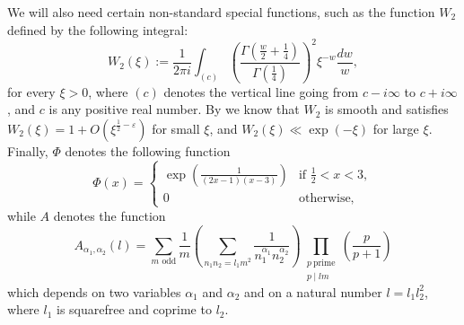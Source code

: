 \documentclass[10pt,a4paper]{amsart}
\theoremstyle{plain}
\theoremstyle{definition}
\theoremstyle{remark}
\begin{document}
We will also need certain non-standard special functions, such as the function $W_2$ defined by the following integral:
\begin{equation} \label{eq:W2}
    W_2(\xi) := \frac{1}{2\pi i}\int_{(c)} \left(\frac{\Gamma(\frac{w}{2}+\frac{1}{4})}{\Gamma(\frac{1}{4})}\right)^2 \xi^{-w} \frac{dw}{w},
\end{equation}
for every $\xi > 0$, where $(c)$ denotes the vertical line going from $c - i \infty$ to $c + i \infty$, and $c$ is any positive real number.
By \cite[Lemma 2.1]{Soundararajan_2000} we know that $W_2$ is smooth and satisfies $W_2(\xi) = 1 + O(\xi^{\frac{1}{2}-\varepsilon})$ for small $\xi$, and $W_2(\xi) \ll \exp(-\xi)$ for large $\xi$.
Finally, $\Phi$ denotes the following function
\begin{equation}
    \label{eq:Phi}
    \Phi(x) =\begin{cases}
\exp \left(\frac{1}{(2x-1)(x-3)}
\right)
&\text{if }\frac{1}{2}
< x < 3,\\
0 &\text{otherwise,}
\end{cases}
\end{equation}
while $A$ denotes the function
\begin{equation}
    \label{eq:A}
    A_{\alpha_1,\alpha_2}(l) = \sum_{m\text{ odd}} \frac{1}{m} \left( \sum_{
n_1 n_2=l_1 m^2}
\frac{1}{n_{1}^{\alpha_{1}}n_{2}^{\alpha_{2}}} \right)
\prod_{\substack{p \ \text{prime} \\ p \mid lm}}\left(\frac{p}{p+1}\right)
\end{equation}
which depends on two variables $\alpha_1$ and $\alpha_2$ and on a natural number $l = l_1 l_2^2$, where $l_1$ is squarefree and coprime to $l_2$.
\end{document}
